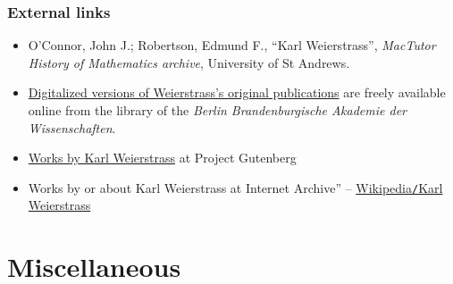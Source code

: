\documentclass{article}
\begin{document}
\subsubsection{External links}
\begin{itemize}
	\item O'Connor, John J.; Robertson, Edmund F., ``Karl Weierstrass'', \textit{MacTutor History of Mathematics archive}, University of St Andrews.
	\item \href{http://bibliothek.bbaw.de/bibliothek-digital/digitalequellen/schriften/autoren/weierstr/}{Digitalized versions of Weierstrass's original publications} are freely available online from the library of the \textit{Berlin Brandenburgische Akademie der Wissenschaften}.
	\item \href{https://www.gutenberg.org/author/Weierstrass,+Karl}{Works by Karl Weierstrass} at Project Gutenberg
	\item Works by or about Karl Weierstrass at Internet Archive'' -- \href{https://en.wikipedia.org/wiki/Karl_Weierstrass}{Wikipedia{\tt/}Karl Weierstrass}
\end{itemize}


\section{Miscellaneous}


\printbibliography[heading=bibintoc]
	
\end{document}
